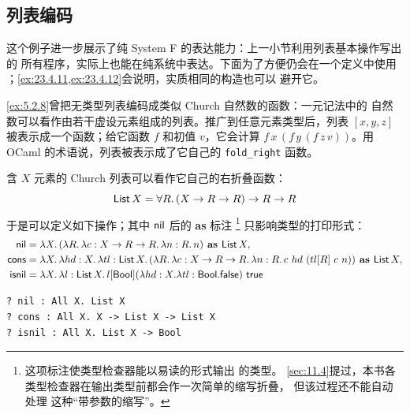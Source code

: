 \subsection*{列表编码}

这个例子进一步展示了纯 System F 的表达能力：上一小节利用列表基本操作写出的
所有程序，实际上也能在纯系统中表达。下面为了方便仍会在一个定义中使用
；\cref{ex:23.4.11,ex:23.4.12}会说明，实质相同的构造也可以
避开它。

\cref{ex:5.2.8}曾把无类型列表编码成类似 Church 自然数的函数：一元记法中的
自然数可以看作由若干虚设元素组成的列表。推广到任意元素类型后，列表
\([x,y,z]\) 被表示成一个函数；给它函数 \(f\) 和初值 \(v\)，它会计算
\(f\,x\,(f\,y\,(f\,z\,v))\)。用 OCaml 的术语说，列表被表示成了它自己的
\texttt{fold\_right} 函数。

含 \(X\) 元素的 Church 列表可以看作它自己的右折叠函数：
\[
\mathsf{List}\,X=\forall R.\,(X\to R\to R)\to R\to R
\]
于是可以定义如下操作；其中 \(\mathsf{nil}\) 后的 \textbf{as} 标注
\footnote{这项标注使类型检查器能以易读的形式输出  的类型。
\cref{sec:11.4}提过，本书各类型检查器在输出类型前都会作一次简单的缩写折叠，
但该过程还不能自动处理  这种“带参数的缩写”。}
只影响类型的打印形式：
\[
\begin{aligned}
\mathsf{nil}
 &={}\lambda X.\,(\lambda R.\,\lambda c:X\to R\to R.\,\lambda n:R.\,n)
   \textbf{ as }\mathsf{List}\,X,\\
\mathsf{cons}
 &={}\lambda X.\,\lambda hd:X.\,\lambda tl:\mathsf{List}\,X.\,
   (\lambda R.\,\lambda c:X\to R\to R.\,\lambda n:R.\,
   c\ hd\ (tl[R]\ c\ n))\textbf{ as }\mathsf{List}\,X,\\
\mathsf{isnil}
 &={}\lambda X.\,\lambda l:\mathsf{List}\,X.\,
   l[\mathsf{Bool}](\lambda hd:X.\lambda tl:\mathsf{Bool}.
   \mathsf{false})\ \mathsf{true}
\end{aligned}
\]
\begin{lstlisting}
? nil : All X. List X
? cons : All X. X -> List X -> List X
? isnil : All X. List X -> Bool
\end{lstlisting}


